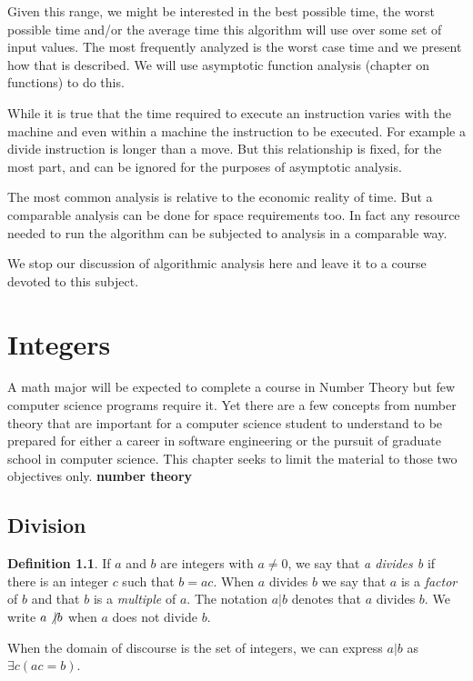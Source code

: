\documentclass[11pt]{book} %
\theoremstyle {definition}
\newtheorem {definition}{Definition}[section]
\theoremstyle {remark}
\begin{document}
Given this range, we might be interested in the best possible time, the worst possible time and/or the average time this algorithm will use over some set of input values. The most frequently analyzed is the worst case time and we present how that is described. We will use asymptotic function analysis (chapter on functions) to do this. 

While it is true that the time required to execute an instruction varies with the machine and even within a machine the instruction to be executed. For example a divide instruction is longer than a move. But this relationship is fixed, for the most part, and can be ignored for the purposes of asymptotic analysis. 

The most common analysis is relative to the economic reality of time. But a comparable analysis can be done for space requirements too. In fact any resource needed to run the algorithm can be subjected to analysis in a comparable way.

We stop our discussion of algorithmic analysis here and leave it to a course devoted to this subject.
\newpage




\chapter {Integers}
A math major will be expected to complete a course in Number Theory but few computer science programs require it. Yet there are a few concepts from number theory that are important for a computer science student to understand to be prepared for either a career in software engineering or the pursuit of graduate school in computer science. This chapter seeks to limit the material to those two objectives only.
\textbf{number theory}
\section{Division}
\begin{definition}
If $a$ and $b$ are integers with $a \neq 0$, we say that \textit{a divides b} if there is an integer $c$ such that $b=ac$. When $a$ divides $b$ we say that $a$ is a \textit{factor} of $b$ and that $b$ is a \textit{multiple} of $a$. The notation $a \vert b$ denotes that $a$ divides $b$. We write $a \not\vert b$ when $a$ does not divide $b$.

When the domain of discourse is the set of integers, we can express $a\vert b$ as $\exists c(ac=b)$.
\end{definition}
\end{document}
